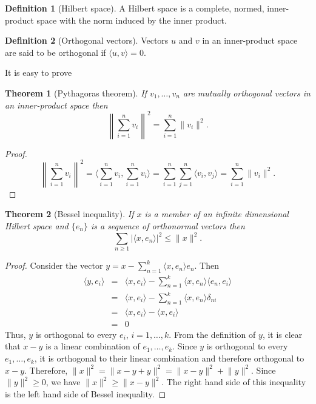 \documentclass{article}
\theoremstyle{plain}
\newtheorem{thm}{Theorem}
\numberwithin{thm}{section}
\theoremstyle{plain}
\numberwithin{prop}{section}
\theoremstyle{definition}
\newtheorem{defn}{Definition}
\numberwithin{defn}{section}
\theoremstyle{remark}
\numberwithin{equation}{section}
\begin{document}
\begin{defn}[Hilbert space]\label{s3d3}
A Hilbert space is a complete, normed, inner-product space with the norm induced
by the inner product.
\end{defn}

\begin{defn}[Orthogonal vectors]\label{s3d4}
Vectors $u$ and $v$ in an inner-product space are said to be orthogonal if 
$\langle u, v \rangle = 0$.
\end{defn}

It is easy to prove
\begin{thm}[Pythagoras theorem]\label{s3t2}
If $v_1, \ldots, v_n$ are mutually orthogonal vectors in an inner-product space
then
\[
\left\lVert\sum_{i=1}^n v_i\right\rVert^2 = \sum_{i=1}^n\lVert v_i\rVert^2.
\]
\end{thm}
\begin{proof}
\[
\left\lVert\sum_{i=1}^n v_i\right\rVert^2 = \langle \sum_{i=1}^n v_i,
\sum_{i=1}^n v_i\rangle = \sum_{i=1}^n\sum_{j=1}^n\langle v_i, v_j\rangle
= \sum_{i=1}^n\lVert v_i\rVert^2.
\]
\end{proof}

\begin{thm}[Bessel inequality]\label{s3t3}
If $x$ is a member of an infinite dimensional  Hilbert space and $\{e_n\}$ is 
a sequence of orthonormal vectors then 
\[
\sum_{n \ge 1}|\langle x, e_n\rangle|^2 \le \lVert x \rVert^2.
\]
\end{thm}
\begin{proof}
Consider the vector $y = x - \sum_{n=1}^k\langle x, e_n\rangle e_n$.
Then 
\begin{eqnarray*}
\langle y, e_i\rangle &=& 
\langle x, e_i\rangle-\sum_{n=1}^k\langle x, e_n\rangle\langle e_n, e_i\rangle\\
&=& \langle x, e_i\rangle-\sum_{n=1}^k\langle x, e_n\rangle\delta_{ni} \\
&=& \langle x, e_i\rangle - \langle x, e_i\rangle \\
&=& 0
\end{eqnarray*}
Thus, $y$ is orthogonal to every $e_i$, $i = 1, \ldots, k$. From the definition
of $y$, it is clear that $x - y$ is a linear combination of $e_1, \ldots, e_k$.
Since $y$ is orthogonal to every $e_1, \ldots, e_k$, it is orthogonal to their
linear combination and therefore orthogonal to $x - y$. Therefore,
$\lVert x \rVert^2 = \lVert x - y + y\rVert^2 = \lVert x - y\rVert^2 + \lVert
y \rVert^2$. Since $\lVert y \rVert^2 \ge 0$, we have $\lVert x \rVert^2 \ge
\lVert x - y\rVert^2$. The right hand side of this inequality is the left hand
side of Bessel inequality.
\end{proof}
\end{document}
